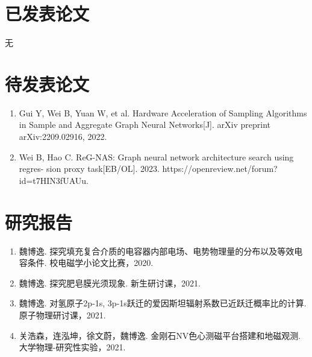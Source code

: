 
\begin{publications}

\section*{已发表论文}
无

\section*{待发表论文}

\begin{enumerate}
\item Gui Y, Wei B, Yuan W, et al. Hardware Acceleration of Sampling Algorithms in Sample and Aggregate Graph Neural Networks[J]. arXiv preprint arXiv:2209.02916, 2022.
\item Wei B, Hao C. ReG-NAS: Graph neural network architecture search using regres-
sion proxy task[EB/OL]. 2023. https://openreview.net/forum?id=t7HIN3fUAUu.


\end{enumerate}

\section*{研究报告}
\begin{enumerate}
\item 魏博逸. 探究填充复合介质的电容器内部电场、电势物理量的分布以及等效电容条件. 校电磁学小论文比赛，2020.
\item 魏博逸. 探究肥皂膜光须现象. 新生研讨课，2021.
\item 魏博逸. 对氢原子2p-1s, 3p-1s跃迁的爱因斯坦辐射系数已近跃迁概率比的计算. 原子物理研讨课，2021.
\item 关浩森，连泓坤，徐文蔚，魏博逸. 金刚石NV色心测磁平台搭建和地磁观测. 大学物理-研究性实验，2021.
\end{enumerate}

\end{publications}
